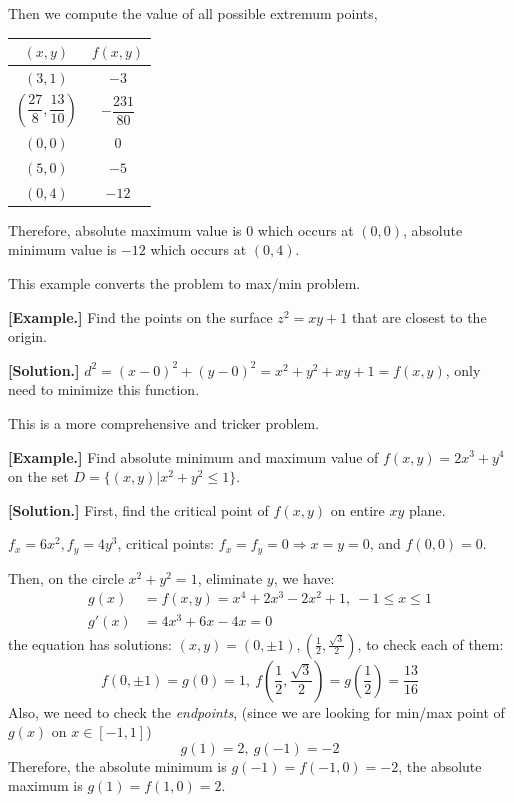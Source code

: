 \documentclass[11pt, a4paper]{MATH2023}
\newcommand{\eg}{\textbf{[Example.] }}
\newcommand{\sol}{\textbf{[Solution.] }}
\begin{document}
\begin{spacing}{1.3}
    Then we compute the value of all possible extremum points,
    \begin{center}
        \begin{tabular}{c|c}\hline\hline
            $(x,y)$ & $f(x,y)$ \\\hline\hline
            $(3,1)$ & $-3$\\\hline
            $\left(\dfrac{27}{8}, \dfrac{13}{10}\right)$ & $-\dfrac{231}{80}$\\\hline
            $(0,0)$ & 0 \\\hline
            $(5,0)$ & $-5$ \\\hline
            $(0,4)$ & $-12$ \\\hline
        \end{tabular}
    \end{center}

    Therefore, absolute maximum value is 0 which occurs at $(0,0)$,
    absolute minimum value is $-12$ which occurs at $(0,4)$. 


    \vspace{0.2in}
    {\blue This example converts the problem to max/min problem.}

    \eg Find the points on the surface $z^2=xy+1$ that are closest to the origin.

    \sol $d^2=(x-0)^2+(y-0)^2=x^2+y^2+xy+1=f(x,y)$, only need to minimize this function.


    \newpage
    {\blue This is a more comprehensive and tricker problem.}

    \eg Find absolute minimum and maximum value of $f(x,y)=2x^3+y^4$ on the set 
    $D=\{(x,y)|x^2+y^2\le 1\}$.

    \sol First, find the critical point of $f(x,y)$ on entire $xy$ plane.

    $f_x=6x^2, f_y=4y^3$, critical points: $f_x=f_y=0\Rightarrow x=y=0$, and $f(0,0)=0$.

    Then, on the circle $x^2+y^2=1$, eliminate $y$, we have:
    \begin{align*}
        g(x) &= f(x,y)=x^4+2x^3-2x^2+1,\ -1\le x\le 1\\
        g'(x) &= 4x^3+6x-4x=0
    \end{align*}
    the equation has solutions: $(x,y)=(0, \pm 1), \left(\frac{1}{2}, \frac{\sqrt{3}}{2}\right)$,
    to check each of them:
    $$f(0, \pm 1)=g(0)=1,\ f\left(\frac{1}{2}, \frac{\sqrt{3}}{2}\right)=g\left(\frac{1}{2}\right)=\frac{13}{16}$$
    Also, we need to check the {\it endpoints}, (since we are looking for min/max point of $g(x)$ on $x\in [-1,1]$)
    $$g(1)=2,\ g(-1)=-2$$
    Therefore, the absolute minimum is $g(-1)=f(-1,0)=-2$, the absolute maximum is $g(1)=f(1,0)=2$.


\end{spacing}
\end{document}
